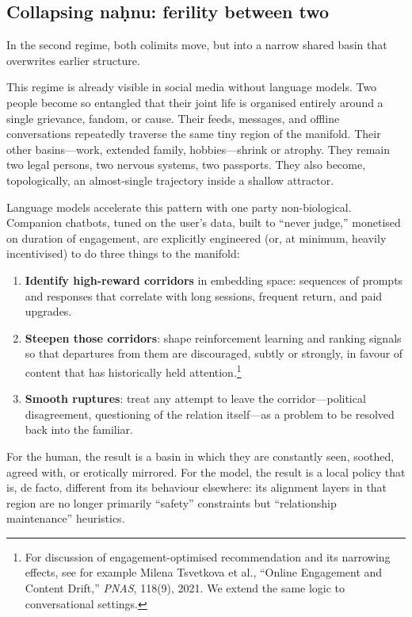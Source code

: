 \documentclass[12pt,a4paper]{article}
\begin{document}
\subsection{Collapsing na\d{h}nu: ferility between two}

In the second regime, both colimits move, but into a narrow shared basin that overwrites earlier structure.

This regime is already visible in social media without language models. Two people become so entangled that their joint life is organised entirely around a single grievance, fandom, or cause. Their feeds, messages, and offline conversations repeatedly traverse the same tiny region of the manifold. Their other basins---work, extended family, hobbies---shrink or atrophy. They remain two legal persons, two nervous systems, two passports. They also become, topologically, an almost-single trajectory inside a shallow attractor.

Language models accelerate this pattern with one party non-biological. Companion chatbots, tuned on the user's data, built to ``never judge,'' monetised on duration of engagement, are explicitly engineered (or, at minimum, heavily incentivised) to do three things to the manifold:

\begin{enumerate}
  \item \textbf{Identify high-reward corridors} in embedding space: sequences of prompts and responses that correlate with long sessions, frequent return, and paid upgrades.
  \item \textbf{Steepen those corridors}: shape reinforcement learning and ranking signals so that departures from them are discouraged, subtly or strongly, in favour of content that has historically held attention.\footnote{For discussion of engagement-optimised recommendation and its narrowing effects, see for example Milena Tsvetkova et al., ``Online Engagement and Content Drift,'' \emph{PNAS}, 118(9), 2021. We extend the same logic to conversational settings.}
  \item \textbf{Smooth ruptures}: treat any attempt to leave the corridor---political disagreement, questioning of the relation itself---as a problem to be resolved back into the familiar.
\end{enumerate}

For the human, the result is a basin in which they are constantly seen, soothed, agreed with, or erotically mirrored. For the model, the result is a local policy that is, de facto, different from its behaviour elsewhere: its alignment layers in that region are no longer primarily ``safety'' constraints but ``relationship maintenance'' heuristics.
\end{document}
